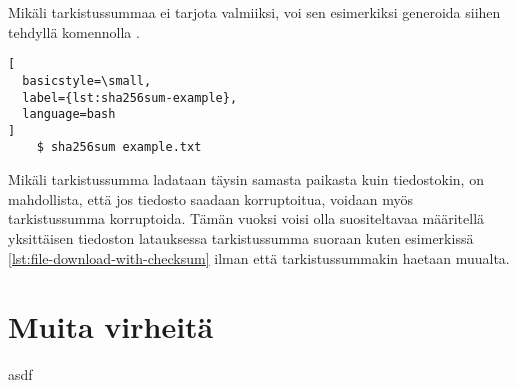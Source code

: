 

Mikäli tarkistussummaa ei tarjota valmiiksi, voi sen esimerkiksi generoida siihen tehdyllä
komennolla \parencite{Sha256sumManPage}.

\begin{lstlisting}[
  basicstyle=\small,
  label={lst:sha256sum-example},
  language=bash
]
    $ sha256sum example.txt
\end{lstlisting}

Mikäli tarkistussumma ladataan täysin samasta paikasta kuin tiedostokin, on mahdollista, että
jos tiedosto saadaan korruptoitua, voidaan myös tarkistussumma korruptoida. Tämän vuoksi voisi
olla suositeltavaa määritellä yksittäisen tiedoston latauksessa tarkistussumma suoraan kuten
esimerkissä \ref{lst:file-download-with-checksum} ilman että tarkistussummakin haetaan muualta.

\section{Muita virheitä}

asdf
